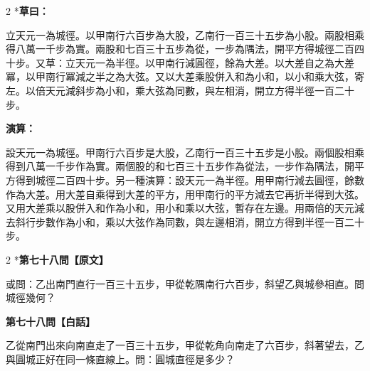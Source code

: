 \documentclass[11pt,a4paper]{article}
\begin{document}
\begin{paracol}{2}
\switchcolumn[0]*\textbf{草曰：}

\small 立天元一為城徑。以甲南行六百步為大股，乙南行一百三十五步為小股。兩股相乘得八萬一千步為實。兩股和七百三十五步為從，一步為隅法，開平方得城徑二百四十步。又草：立天元一為半徑。以甲南行減圓徑，餘為大差。以大差自之為大差冪，以甲南行冪減之半之為大弦。又以大差乘股併入和為小和，以小和乘大弦，寄左。以倍天元減斜步為小和，乘大弦為同數，與左相消，開立方得半徑一百二十步。

\switchcolumn\textbf{演算：}

\small 設天元一為城徑。甲南行六百步是大股，乙南行一百三十五步是小股。兩個股相乘得到八萬一千步作為實。兩個股的和七百三十五步作為從法，一步作為隅法，開平方得到城徑二百四十步。另一種演算：設天元一為半徑。用甲南行減去圓徑，餘數作為大差。用大差自乘得到大差的平方，用甲南行的平方減去它再折半得到大弦。又用大差乘以股併入和作為小和，用小和乘以大弦，暫存在左邊。用兩倍的天元減去斜行步數作為小和，乘以大弦作為同數，與左邊相消，開立方得到半徑一百二十步。
\end{paracol}

\vspace{0.1cm}
\noindent{}
\par\vspace{0.3cm}

\begin{paracol}{2}
\switchcolumn[0]*\noindent\textbf{第七十八問【原文】}

\small 或問：乙出南門直行一百三十五步，甲從乾隅南行六百步，斜望乙與城參相直。問城徑幾何？

\switchcolumn\noindent\textbf{第七十八問【白話】}

\small 乙從南門出來向南直走了一百三十五步，甲從乾角向南走了六百步，斜著望去，乙與圓城正好在同一條直線上。問：圓城直徑是多少？
\end{paracol}

\vspace{0.1cm}
\noindent{}
\par\vspace{0.15cm}
\end{document}
